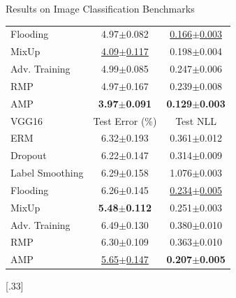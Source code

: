 \begin{frame}{Results on Image Classification Benchmarks}
\begin{table}[t]
{{\begin{tabular}{lcc}
Flooding & 4.97$\pm$0.082 & \underline{0.166$\pm$0.003} \\
MixUp & \underline{4.09$\pm$0.117} & 0.198$\pm$0.004 \\
Adv. Training & 4.99$\pm$0.085 & 0.247$\pm$0.006 \\
RMP & 4.97$\pm$0.167 & 0.239$\pm$0.008 \\
AMP & \textbf{3.97$\pm$0.091} & \textbf{0.129$\pm$0.003} \\
\midrule
VGG16 & Test Error (\%) & Test NLL \\
\midrule
ERM & 6.32$\pm$0.193 & 0.361$\pm$0.012 \\
Dropout & 6.22$\pm$0.147 & 0.314$\pm$0.009 \\
Label Smoothing & 6.29$\pm$0.158 & 1.076$\pm$0.003 \\
Flooding & 6.26$\pm$0.145 & \underline{0.234$\pm$0.005} \\
MixUp & \textbf{5.48$\pm$0.112} & 0.251$\pm$0.003 \\
Adv. Training & 6.49$\pm$0.130 & 0.380$\pm$0.010 \\
RMP & 6.30$\pm$0.109 & 0.363$\pm$0.010 \\
AMP & \underline{5.65$\pm$0.147} & \textbf{0.207$\pm$0.005} \\
\bottomrule
\end{tabular}
}%
}%
[.33\textwidth]{%
}
\end{table}
\end{frame}
